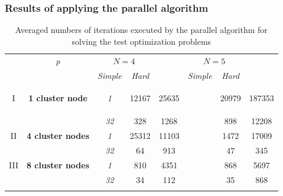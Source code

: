 \documentclass[aspectratio=1610]{beamer}
\begin{document}
\begin{frame}
  \frametitle{Results of applying the parallel algorithm}

  \begin{table}
    \centering
    \caption{Averaged numbers of iterations executed by the parallel algorithm for solving the test
  optimization problems}
    \label{tab:iterations}
    \begin{tabular}{cccccccc}
      \cline{3-8}\noalign{\smallskip}
      \multicolumn{2}{c}{  } & \textit{p} & \multicolumn{2}{c}{$N=4$} & &
  \multicolumn{2}{c}{$N=5$}   \\
      \noalign{\smallskip} \cline{4-5} \cline{7-8}  \noalign{\smallskip}
      \multicolumn{2}{c}{  } & & \textit{Simple} & \textit{Hard} & & \textit{Simple} &
  \textit{Hard}  \\
      \noalign{\smallskip}\hline
      I &
      \parbox{0.25\textwidth}{
      \begin{center}
      \textbf{1 cluster node}
      \end{center}		}
        & \textit{1} & 12167 & 25635 & & 20979 & 187353  \\
      &  & \textit{32} & 328 & 1268  & &   898 & 12208 \\
      \hline \noalign{\smallskip}
  II  & \textbf{4 cluster nodes}  %
    & \textit{1} & 25312 & 11103 & & 1472 & 17009 \\
  &   & \textit{32} & 64 &   913 & & 47 & 345 \\
      \noalign{\smallskip}\hline	\noalign{\smallskip}
  III & \textbf{8 cluster nodes} %
    & \textit{1}  & 810 & 4351 & & 868 & 5697  \\
  & & \textit{32} & 34  & 112  & & 35  & 868 \\
      \noalign{\smallskip}\hline
    \end{tabular}
  \end{table}

\end{frame}
\end{document}
